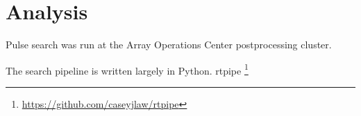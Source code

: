 \section{Analysis}
 
 Pulse search was run at the Array Operations Center postprocessing cluster.
 
 The search pipeline is written largely in Python.
rtpipe \footnote{\url{https://github.com/caseyjlaw/rtpipe}}
 